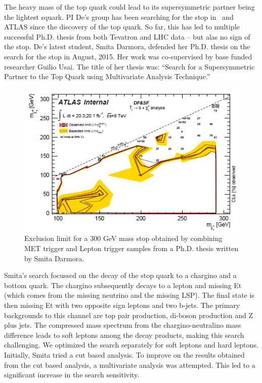 \label{sec:kd_susy_smita}
The heavy mass of the top quark could lead to its supersymmetric partner being the lightest squark. PI De's group has been searching for the stop in \ and ATLAS since the discovery of the top quark. So far, this has led to multiple successful Ph.D. thesis from both Tevatron and LHC data -- but alas no sign of the stop. De's latest student, Smita Darmora, defended her Ph.D. thesis on the search for the stop in August, 2015. Her work was co-supervised by base funded researcher Guilio Usai. The title of her thesis was: ``Search for a Supersymmetric Partner to the Top Quark using Multivariate Analysis Technique.'' 

\begin{figure}[hbt]
\begin{center}
  \includegraphics[width=5in]{De/smita_limit.png}
  \caption{Exclusion limit for a 300 GeV mass stop obtained by combining MET trigger and Lepton trigger samples from a Ph.D.  thesis written by Smita Darmora.}
  \label{smita_limit}
\end{center}
\end{figure}

Smita's search focussed on the decay of the stop quark to a chargino and a bottom quark. The chargino subsequently decays to a lepton and missing Et (which comes from the missing neutrino and the missing LSP). The final state is then missing Et with two opposite sign leptons and two b-jets. The primary backgrounds to this channel are top pair production, di-boson production and Z plus jets. The compressed mass spectrum from the chargino-neutralino mass difference leads to soft leptons among the decay products, making this search challenging. We optimized the search separately for soft leptons and hard leptons. Initially, Smita tried a cut based analysis. To improve on the results obtained from the cut based analysis, a multivariate analysis was attempted. This led to a significant increase in the search sensitivity.

